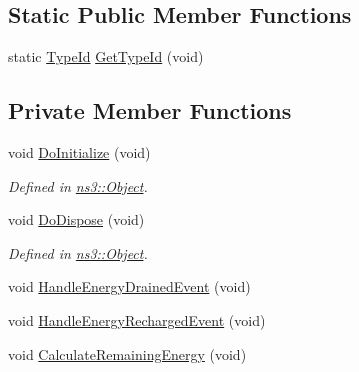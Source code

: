 \subsection*{Static Public Member Functions}
\begin{DoxyCompactItemize}
\item 
static \hyperlink{classns3_1_1TypeId}{Type\+Id} \hyperlink{classns3_1_1BasicEnergySource_aa8c6107bebcb44214d0aa99ca5aa842e}{Get\+Type\+Id} (void)
\end{DoxyCompactItemize}
\subsection*{Private Member Functions}
\begin{DoxyCompactItemize}
\item 
void \hyperlink{classns3_1_1BasicEnergySource_af8a8c06e1d559059719560dea1a5be9e}{Do\+Initialize} (void)
\begin{DoxyCompactList}\small\item\em Defined in \hyperlink{classns3_1_1Object}{ns3\+::\+Object}. \end{DoxyCompactList}\item 
void \hyperlink{classns3_1_1BasicEnergySource_ae40ac69647863cc10a00d3a52699ac38}{Do\+Dispose} (void)
\begin{DoxyCompactList}\small\item\em Defined in \hyperlink{classns3_1_1Object}{ns3\+::\+Object}. \end{DoxyCompactList}\item 
void \hyperlink{classns3_1_1BasicEnergySource_a379c805875adf5d627a5ac4ffa4b2d46}{Handle\+Energy\+Drained\+Event} (void)
\item 
void \hyperlink{classns3_1_1BasicEnergySource_a9fe7a65d106b938a8faad8e7e9f998a5}{Handle\+Energy\+Recharged\+Event} (void)
\item 
void \hyperlink{classns3_1_1BasicEnergySource_adae3ce4cc2dbead3d27ae5eafaa7126b}{Calculate\+Remaining\+Energy} (void)
\end{DoxyCompactItemize}
